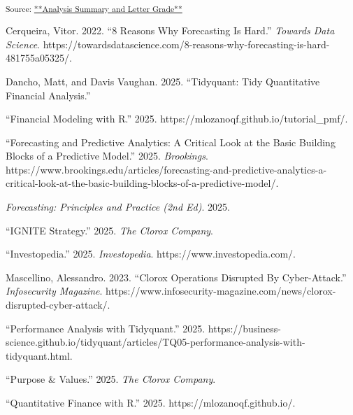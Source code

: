 \documentclass[
  letterpaper,
  DIV=11,
  numbers=noendperiod]{scrartcl}
\newlength{\cslhangindent}
\newenvironment{CSLReferences}[2] %
 {\begin{list}{}{%
  \setlength{\itemindent}{0pt}
  \setlength{\leftmargin}{0pt}
  \setlength{\parsep}{0pt}
  \ifodd #1
   \setlength{\leftmargin}{\cslhangindent}
   \setlength{\itemindent}{-1\cslhangindent}
  \fi
  \setlength{\itemsep}{#2\baselineskip}}}
 {\end{list}}
\begin{document}
\textsubscript{Source:
\href{https://ds-an.github.io/computational-finance-project/documents/summary-preview.html\#b28fa6ea-44f3-43f9-8353-8df995836b56}{**Analysis
Summary and Letter Grade**}}

\label{refs}
\begin{CSLReferences}{1}{0}
Cerqueira, Vitor. 2022. {``8 {Reasons Why Forecasting Is Hard}.''}
\emph{Towards Data Science}.
https://towardsdatascience.com/8-reasons-why-forecasting-is-hard-481755a05325/.

Dancho, Matt, and Davis Vaughan. 2025. {``Tidyquant: {Tidy Quantitative
Financial Analysis}.''}

{``Financial Modeling with {R}.''} 2025.
https://mlozanoqf.github.io/tutorial\_pmf/.

{``Forecasting and Predictive Analytics: {A} Critical Look at the Basic
Building Blocks of a Predictive Model.''} 2025. \emph{Brookings}.
https://www.brookings.edu/articles/forecasting-and-predictive-analytics-a-critical-look-at-the-basic-building-blocks-of-a-predictive-model/.

\emph{Forecasting: {Principles} and {Practice} (2nd Ed)}. 2025.

{``{IGNITE Strategy}.''} 2025. \emph{The Clorox Company}.

{``Investopedia.''} 2025. \emph{Investopedia}.
https://www.investopedia.com/.

Mascellino, Alessandro. 2023. {``Clorox {Operations Disrupted By
Cyber-Attack}.''} \emph{Infosecurity Magazine}.
https://www.infosecurity-magazine.com/news/clorox-disrupted-cyber-attack/.

{``Performance {Analysis} with Tidyquant.''} 2025.
https://business-science.github.io/tidyquant/articles/TQ05-performance-analysis-with-tidyquant.html.

{``Purpose \& {Values}.''} 2025. \emph{The Clorox Company}.

{``Quantitative Finance with {R}.''} 2025. https://mlozanoqf.github.io/.


\end{CSLReferences}
\end{document}
